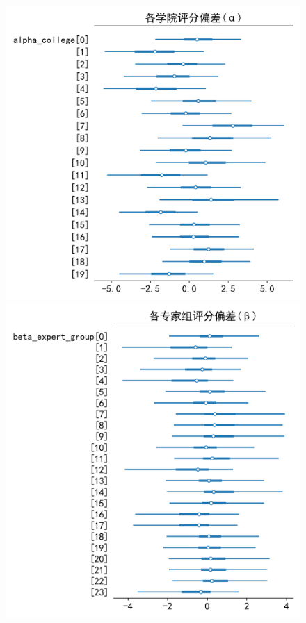 \documentclass[withoutpreface,bwprint]{cumcmthesis}
\begin{document}
\begin{figure}[H]
    \centering
    \begin{minipage}[t]{0.48\textwidth}
        \centering
        \includegraphics[width=1\textwidth]{figures/Diagnostics/college_effects_forest.png}
    \end{minipage}
    \hfill
    \begin{minipage}[t]{0.48\textwidth}
        \centering
        \includegraphics[width=1\textwidth]{figures/Diagnostics/expert_group_effects_forest.png}
    \end{minipage}
\end{figure}
\end{document}

